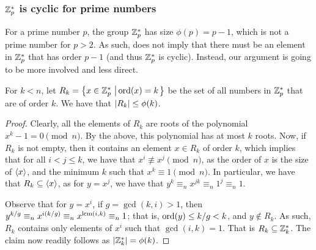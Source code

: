 \subsubsection{$\mathbb{Z}_p^*$ is cyclic for prime numbers}

For a prime number $p$, the group $\mathbb{Z}_p^*$ has size $\phi(p) = p-1$,
which is not a prime number for $p>2$.  As such,
 does not imply that there must be an element in
$\mathbb{Z}_p^*$ that has order $p-1$ (and thus $\mathbb{Z}_p^*$ is
cyclic). Instead, our argument is going to be more involved and less
direct.


\begin{lemma}
    For $k < n$, let
    \begin{math}
        R_k = \brc{ x \in \ZZ_p^* \sep{ \ordX{x} = k}}
    \end{math}
    be the set of all numbers in $\mathbb{Z}_p^*$ that are of order $k$. We
    have that $\cardin{R_k} \leq \phi\pth{k}$.
\end{lemma}

\begin{proof}
    Clearly, all the elements of $R_k$ are roots of the polynomial
    $x^k - 1 = 0 \pmod{n}$. By the above, this polynomial has at most
    $k$ roots.  Now, if $R_k$ is not empty, then it contains an
    element $x \in R_k$ of order $k$, which implies that for all $i <
    j \leq k$, we have that $x^i \nequiv x^j \pmod{n}$, as the order
    of $x$ is the size of $\left\langle {x} \right\rangle$, and the minimum $k$ such that
    $x^k \equiv 1 \pmod{n}$. In particular, we have that $R_k
    \subseteq \left\langle {x} \right\rangle$, as for $y = x^j$, we have that $y^k
    \equiv_n x^{jk} \equiv_n 1^j \equiv_n 1$.

    Observe that for $y = x^i$, if $g= \gcd(k,i)> 1$, then $y^{k/g}
    \equiv_n x^{i(k/g)} \equiv_n x^{\mathop{\mathrm{lcm}}(i,k)} \equiv_n 1$; that is,
    $\ordX{y} \leq k/g < k$, and $y \notin R_k$. As such, $R_k$
    contains only elements of $x^i$ such that $\gcd(i,k)=1$. That is
    $R_k \subseteq \mathbb{Z}_k^*$. The claim now readily follows as
    $\left| {\mathbb{Z}_k^*} \right| = \phi(k)$.
\end{proof}


